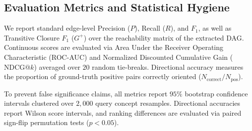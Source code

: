 \subsection{Evaluation Metrics and Statistical Hygiene}
We report standard edge-level Precision ($P$), Recall ($R$), and $F_1$, as well as Transitive Closure $F_1$ ($G^+$) over the reachability matrix of the extracted DAG. Continuous scores are evaluated via Area Under the Receiver Operating Characteristic (ROC-AUC) and Normalized Discounted Cumulative Gain ($\text{NDCG@}k$) averaged over $20$ random tie-breaks. Directional accuracy measures the proportion of ground-truth positive pairs correctly oriented ($N_{\text{correct}} / N_{\text{pos}}$).

To prevent false significance claims, all metrics report $95\%$ bootstrap confidence intervals clustered over $2{,}000$ query concept resamples. Directional accuracies report Wilson score intervals, and ranking differences are evaluated via paired sign-flip permutation tests ($p < 0.05$).
